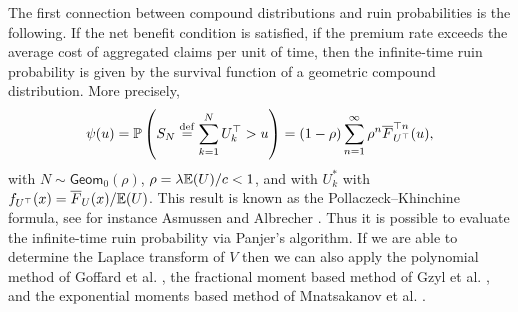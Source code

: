 The first connection between compound distributions and ruin probabilities is the following.
If the net benefit condition is satisfied, \ie if the premium rate exceeds the average cost of aggregated claims per unit of time, then the infinite-time ruin probability is given by the survival function of a geometric compound distribution. More precisely,
\begin{equation*}\label{eq:PollaczeckKhinchineFormula}
\psi(u) = \mathbb P\left(S_N \overset{\mathrm{def}}{=} \sum_{k=1}^{N}U^\top_{k}>u\right)
= (1 - \rho) \sum_{n=1}^\infty \rho^n \overline{F}_{U^\top}^{\top n}(u),
\end{equation*}
with $N \sim \mathsf{Geom}_0(\rho)$, $\rho = \lambda\mathbb E(U)/c<1$, and with \iid $U^\ast_{k}$ with \pdf $f_{U^\top}(x)= \overline{F}_U(x) / \mathbb E(U)$. This result is known as the Pollaczeck--Khinchine formula, see for instance Asmussen and Albrecher \cite[Chapter IV, (2.2)]{AsAl10}. Thus it is possible to evaluate the infinite-time ruin probability via Panjer's algorithm. If we are able to determine the Laplace transform of $V$ then we can also apply the polynomial method of Goffard et al. \cite{GoLoPo15}, the fractional moment based method of Gzyl et al. \cite{GzNITa13}, and the exponential moments based method of Mnatsakanov et al. \cite{MnSaHa15}.


